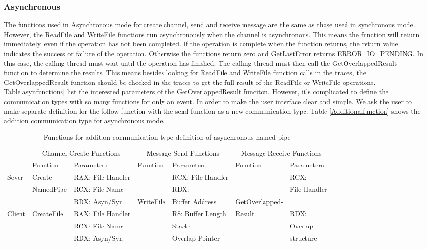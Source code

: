 \subsubsection{Asynchronous}
The functions used in Asynchronous mode for create channel, send and receive message are the same as those used in synchronous mode. However,  the ReadFile and WriteFile functions run asynchronously when the channel is asynchronous. This means the function will return immediately, even if the operation has not been completed. If the operation is complete when the function returns, the return value indicates the success or failure of the operation. Otherwise the functions return zero and GetLastError returns ERROR\_IO\_PENDING. In this case, the calling thread must wait until the operation has finished. The calling thread must then call the GetOverlappedResult function to determine the results. This means besides looking for ReadFile and WriteFile function calls in the traces, the GetOverlappedResult function should be checked in the traces to get the full result of the ReadFile or WriteFile operations. Table\ref{asynfunctions} list the interested parameters of the GetOverlappedResult funciton. However, it's complicated to define the communication types with so many functions for only an event. In order to make the user interface clear and simple. We ask the user to make separate definition for the follow function with the send function as a new communication type. Table \ref{Additionalfunction} shows the addition communication type for asynchronous mode.

\begin{table}[h]
        \centering
        \caption{Functions for addition communication type definition of asynchronous named pipe}
        \label{synfunctions}
        \begin{tabular}{|l|l|l|l|l|l|l|}
            \hline
             \multirow{2}{*}{} &
               \multicolumn{2}{c|}{Channel Create Functions} &
               \multicolumn{2}{c|}{Message Send Functions} &
               \multicolumn{2}{c|}{Message Receive Functions} \\
             \cline{2-7}
              & Function& Parameters & Function & Parameters  & Function & Parameters\\
             \hline
             Sever& Create-&  RAX: File Handler &  &  RCX: File Handler &&RCX: \\
             \cline{3-3} \cline{5-5} 
             &NamedPipe&RCX: File Name && RDX:  && File Handler\\
              \cline{3-3} 
             &&RDX: Asyn/Syn&WriteFile& Buffer Address &GetOverlapped-&\\
                \cline{1-3} \cline{5-5} \cline{7-7}
             Client & CreateFile & RAX: File Handler & &  R8: Buffer Length &Result&RDX:\\
              \cline{3-3} \cline{5-5} 
             &&RCX: File Name &&Stack:&&Overlap\\
             \cline{3-3} 
             &&RDX: Asyn/Syn&& Overlap Pointer&&structure\\
            \hline
        \end{tabular}
    \end{table}
    


